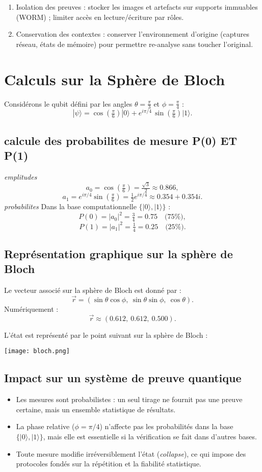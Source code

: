 \documentclass[12pt,a4paper]{article}
\begin{document}
\begin{enumerate}
	 \item Isolation des preuves : stocker les images et artefacts sur supports immuables (WORM) ; limiter accès en lecture/écriture par rôles.
	 \item Conservation des contextes : conserver l’environnement d’origine (captures réseau, états de mémoire) pour permettre re-analyse sans toucher l’original.
	 
	\end{enumerate}
	 \section{Calculs sur la Sphère de Bloch}
	 Considérons le qubit défini par les angles $\theta=\tfrac{\pi}{3}$ et $\phi=\tfrac{\pi}{4}$ : 
	 \[
	 |\psi\rangle = \cos\!\left(\tfrac{\pi}{6}\right)|0\rangle + e^{i\pi/4}\,\sin\!\left(\tfrac{\pi}{6}\right)|1\rangle.
	 \]
	 \subsection{calcule des probabilites de mesure P(0) ET P(1)}
	 \emph{emplitudes}
	 \[
	 a_0 = \cos\!\left(\tfrac{\pi}{6}\right) = \tfrac{\sqrt{3}}{2} \approx 0.866,
	 \]
	 \[
	 a_1 = e^{i\pi/4}\sin\!\left(\tfrac{\pi}{6}\right) = \tfrac{1}{2}e^{i\pi/4} \approx 0.354 + 0.354i.
	 \]
	 \emph{probabilites}
	 Dans la base computationnelle $\{|0\rangle, |1\rangle\}$ :
	 \[
	 P(0) = |a_0|^2 = \tfrac{3}{4} = 0.75 \quad \text{(75\%)},
	 \]
	 \[
	 P(1) = |a_1|^2 = \tfrac{1}{4} = 0.25 \quad \text{(25\%)}.
	 \]
	 \subsection{Représentation graphique sur la sphère de Bloch}
	 Le vecteur associé sur la sphère de Bloch est donné par :
	 \[
	 \vec{r} = (\sin\theta \cos\phi, \ \sin\theta \sin\phi, \ \cos\theta).
	 \]
	 Numériquement :
	 \[
	 \vec{r} \approx (0.612,\ 0.612,\ 0.500).
	 \]
	 
	 L’état est représenté par le point suivant sur la sphère de Bloch : 
	 
	 \begin{center}
	 	\texttt{[image: bloch.png]}
	 \end{center}
	 
	 \subsection{Impact sur un système de preuve quantique}
	 \begin{itemize}
	 	\item Les mesures sont probabilistes : un seul tirage ne fournit pas une preuve certaine, mais un ensemble statistique de résultats.
	 	\item La phase relative ($\phi=\pi/4$) n’affecte pas les probabilités dans la base $\{|0\rangle, |1\rangle\}$, mais elle est essentielle si la vérification se fait dans d’autres bases.
	 	\item Toute mesure modifie irréversiblement l’état (\textit{collapse}), ce qui impose des protocoles fondés sur la répétition et la fiabilité statistique.
	 \end{itemize}
	 
\end{document}

